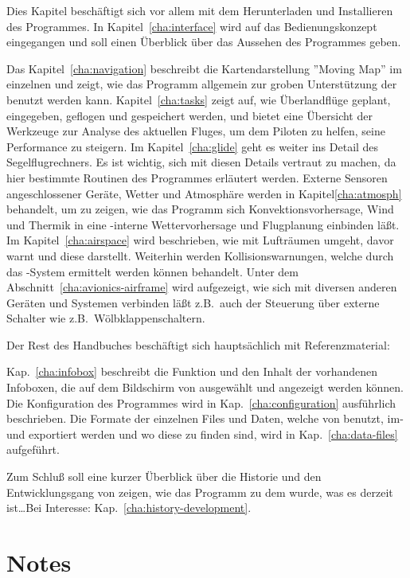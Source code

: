 Dies Kapitel beschäftigt sich vor allem mit dem Herunterladen und Installieren des Programmes.
In Kapitel~\ref{cha:interface} wird auf das Bedienungskonzept eingegangen und soll einen Überblick über das Aussehen des Programmes geben.

Das Kapitel~\ref{cha:navigation} beschreibt die Kartendarstellung ''Moving Map'' im einzelnen  und zeigt, wie das Programm allgemein
zur groben Unterstützung der benutzt werden kann. Kapitel~\ref{cha:tasks} zeigt auf, wie Überlandflüge geplant, eingegeben, geflogen und gespeichert werden, und bietet eine Übersicht
der Werkzeuge zur Analyse des aktuellen Fluges, um dem Piloten zu helfen,  seine Performance zu steigern.
Im Kapitel~\ref{cha:glide} geht es weiter ins Detail des Segelflugrechners.
Es ist wichtig, sich mit diesen Details vertraut zu machen, da hier bestimmte Routinen des Programmes erläutert werden.
Externe Sensoren angeschlossener Geräte, Wetter und Atmosphäre werden in Kapitel\ref{cha:atmosph} behandelt, um zu zeigen, wie das Programm
sich Konvektionsvorhersage, Wind und Thermik in eine \xc-interne Wettervorhersage und Flugplanung einbinden läßt.
Im Kapitel~\ref{cha:airspace} wird beschrieben, wie \xc mit Lufträumen umgeht, davor warnt und diese darstellt.
Weiterhin werden Kollisionswarnungen, welche durch das \fl-System ermittelt werden können behandelt.
Unter dem Abschnitt~\ref{cha:avionics-airframe} wird aufgezeigt, wie sich \xc mit diversen anderen Geräten und Systemen
verbinden läßt z.B.\ auch der Steuerung über externe Schalter wie z.B.\ Wölbklappenschaltern.

Der Rest des Handbuches beschäftigt sich hauptsächlich mit Referenzmaterial:

Kap.~\ref{cha:infobox} beschreibt die Funktion und den Inhalt der vorhandenen Infoboxen, die auf dem Bildschirm von \xc ausgewählt und angezeigt werden können.
Die Konfiguration des Programmes wird in Kap.~\ref{cha:configuration} ausführlich beschrieben.
Die Formate der einzelnen Files und Daten, welche von \xc benutzt, im- und exportiert werden und wo diese zu finden sind,
wird in Kap.~\ref{cha:data-files} aufgeführt.

Zum Schluß soll eine kurzer Überblick über die Historie und den Entwicklungsgang von \xc zeigen, wie das Programm zu dem wurde, was
es derzeit ist\dots Bei Interesse: Kap.~\ref{cha:history-development}.

\section{Notes}



